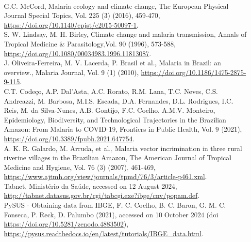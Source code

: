 \documentclass[a4paper,fleqn]{cas-dc}
\begin{document}
\begin{thebibliography}{00}
\\
 G.C. McCord, Malaria ecology and climate change, The European Physical Journal Special Topics, Vol. 225 (3) (2016), 459-470, \href{https://doi.org/10.1140/epjst/e2015-50097-1}{https://doi.org/10.1140/epjst/e2015-50097-1}.
\\
 S. W. Lindsay, M. H. Birley, Climate change and malaria transmission, Annals of Tropical Medicine \& Parasitology,Vol. 90 (1996), 573-588, \href{https://doi.org/10.1080/00034983.1996.11813087}{https://doi.org/10.1080/00034983.1996.11813087}.
\\
 J. Oliveira-Ferreira, M. V. Lacerda, P. Brasil et al., Malaria in Brazil: an overview., Malaria Journal, Vol. 9 (1) (2010), \href{https://doi.org/10.1186/1475-2875-9-115}{https://doi.org/10.1186/1475-2875-9-115}.
\\
 C.T. Codeço, A.P. Dal'Asta, A.C. Rorato, R.M. Lana, T.C. Neves, C.S. Andreazzi, M. Barbosa, M.I.S. Escada, D.A. Fernandes, D.L. Rodrigues, I.C. Reis, M. da Silva-Nunes, A.B. Gontijo, F.C. Coelho, A.M.V. Monteiro, Epidemiology, Biodiversity, and Technological Trajectories in the Brazilian Amazon: From Malaria to COVID-19, Frontiers in Public Health, Vol. 9 (2021), \href{https://doi.org/10.3389/fpubh.2021.647754}{https://doi.org/10.3389/fpubh.2021.647754}.
\\
 A. K. R. Galardo, M. Arruda, et al., Malaria vector incrimination in three rural riverine villages in the Brazilian Amazon, The American Journal of Tropical Medicine and Hygiene, Vol. 76 (3) (2007), 461-469, \href{https://www.ajtmh.org/view/journals/tpmd/76/3/article-p461.xml}{https://www.ajtmh.org/view/journals/tpmd/76/3/article-p461.xml}.
\\
 Tabnet, Ministério da Saúde, accessed on 12 August 2024, \href{http://tabnet.datasus.gov.br/cgi/tabcgi.exe?ibge/cnv/popam.def}{http://tabnet.datasus.gov.br/cgi/tabcgi.exe?ibge/cnv/popam.def}.
\\
 PySUS - Obtaining data from IBGE, F. C. Coelho, B. C.  Baron, G. M. C. Fonseca, P. Reck, D. Palumbo (2021), accessed on 10 October 2024 (doi \href{https://doi.org/10.5281/zenodo.4883502}{https://doi.org/10.5281/zenodo.4883502}), \href{https://pysus.readthedocs.io/en/latest/tutorials/IBGE\_data.html}{https://pysus.readthedocs.io/en/latest/tutorials/IBGE\_data.html}.

\end{thebibliography}
\end{document}
